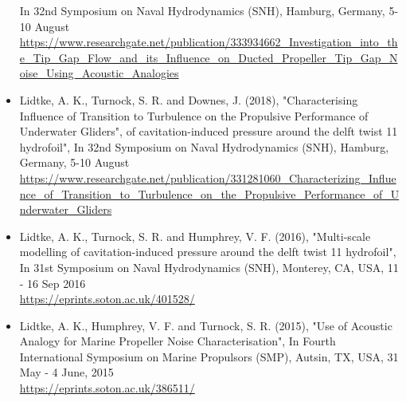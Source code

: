 \documentclass[a4paper,10pt]{article}
\begin{document}
\begin{itemize}
	In 32nd Symposium on Naval Hydrodynamics (SNH), Hamburg, Germany, 5-10 August
	\cite{Higgens2018}
	\\ \url{https://www.researchgate.net/publication/333934662\_Investigation\_into\_the\_Tip\_Gap\_Flow\_and\_its\_Influence\_on\_Ducted\_Propeller\_Tip\_Gap\_Noise\_Using\_Acoustic\_Analogies}
%
\item Lidtke, A. K., Turnock, S. R. and Downes, J. (2018),
	"Characterising Influence of Transition to Turbulence on the Propulsive Performance of Underwater Gliders",
	of cavitation-induced pressure around the delft twist 11 hydrofoil",
	In 32nd Symposium on Naval Hydrodynamics (SNH), Hamburg, Germany, 5-10 August
	\cite{Lidtke2018}
	\\ \url{https://www.researchgate.net/publication/331281060_Characterizing_Influence_of_Transition_to_Turbulence_on_the_Propulsive_Performance_of_Underwater_Gliders}
%
\item Lidtke, A. K., Turnock, S. R. and Humphrey, V. F. (2016), "Multi-scale modelling
	of cavitation-induced pressure around the delft twist 11 hydrofoil",
	In 31st Symposium on Naval Hydrodynamics (SNH), Monterey, CA, USA, 11 - 16 Sep 2016
	\cite{Lidtke2016b}
	\\ \url{https://eprints.soton.ac.uk/401528/}
%
\item Lidtke, A. K., Humphrey, V. F. and Turnock, S. R. (2015), "Use of Acoustic
	Analogy for Marine Propeller Noise Characterisation", In Fourth International
	Symposium on Marine Propulsors (SMP), Autsin, TX, USA, 31 May - 4 June, 2015
	\cite{Lidtke2015a}
	\\ \url{https://eprints.soton.ac.uk/386511/}
%
\end{itemize}

\end{document}
